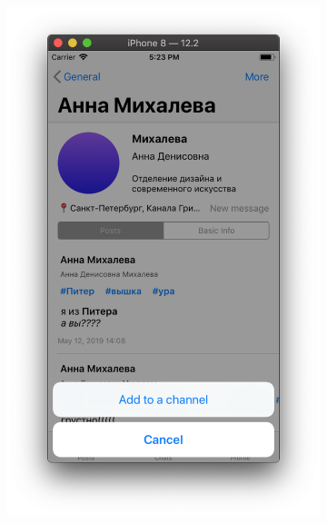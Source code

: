\documentclass[a4paper,12pt]{article}
\begin{document}
\begin{figure}[h!]
\begin{subfigure}[b]{0.3\linewidth}
		\includegraphics[width=\linewidth]{../includes/pmi/otherprofile_functions.png}
	\end{subfigure}
	\begin{subfigure}[b]{0.3\linewidth}

\end{subfigure}
\end{figure}
\end{document}
